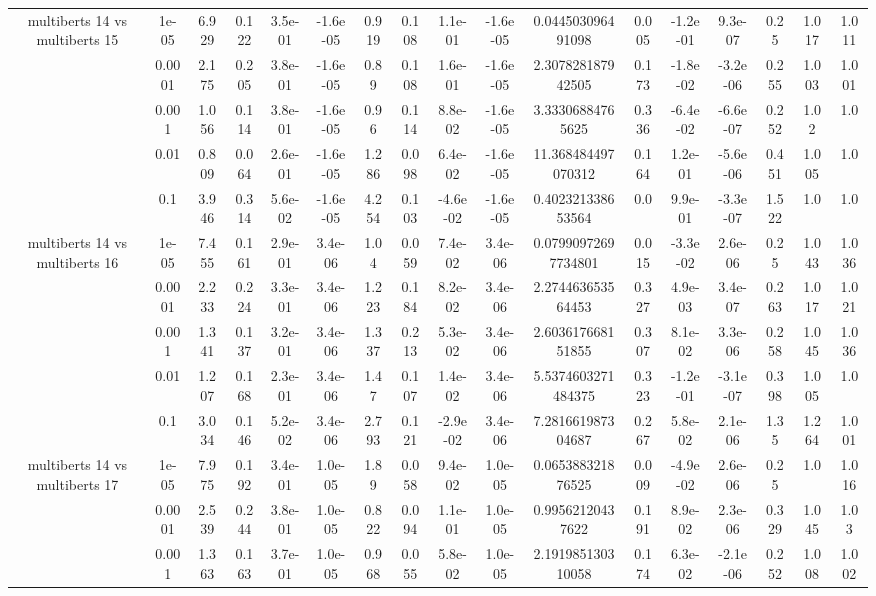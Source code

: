 \begin{tabular}{|c|c|c|c|c|c|c|c|c|c|c|c|c|c|c|c|c|}
\hline
\multirow{5}{*}{multiberts 14 vs multiberts 15} & 1e-05 & 6.929 & 0.122 & 3.5e-01 & -1.6e-05 & 0.919 & 0.108 & 1.1e-01 & -1.6e-05 & 0.044503096491098 & 0.005 & -1.2e-01 & 9.3e-07 & 0.25 & 1.017 & 1.011 \\
 & 0.0001 & 2.175 & 0.205 & 3.8e-01 & -1.6e-05 & 0.89 & 0.108 & 1.6e-01 & -1.6e-05 & 2.307828187942505 & 0.173 & -1.8e-02 & -3.2e-06 & 0.255 & 1.003 & 1.001 \\
 & 0.001 & 1.056 & 0.114 & 3.8e-01 & -1.6e-05 & 0.96 & 0.114 & 8.8e-02 & -1.6e-05 & 3.33306884765625 & 0.336 & -6.4e-02 & -6.6e-07 & 0.252 & 1.02 & 1.0 \\
 & 0.01 & 0.809 & 0.064 & 2.6e-01 & -1.6e-05 & 1.286 & 0.098 & 6.4e-02 & -1.6e-05 & 11.368484497070312 & 0.164 & 1.2e-01 & -5.6e-06 & 0.451 & 1.005 & 1.0 \\
 & 0.1 & 3.946 & 0.314 & 5.6e-02 & -1.6e-05 & 4.254 & 0.103 & -4.6e-02 & -1.6e-05 & 0.402321338653564 & 0.0 & 9.9e-01 & -3.3e-07 & 1.522 & 1.0 & 1.0 \\
\hline
\multirow{5}{*}{multiberts 14 vs multiberts 16} & 1e-05 & 7.455 & 0.161 & 2.9e-01 & 3.4e-06 & 1.04 & 0.059 & 7.4e-02 & 3.4e-06 & 0.07990972697734801 & 0.015 & -3.3e-02 & 2.6e-06 & 0.25 & 1.043 & 1.036 \\
 & 0.0001 & 2.233 & 0.224 & 3.3e-01 & 3.4e-06 & 1.223 & 0.184 & 8.2e-02 & 3.4e-06 & 2.274463653564453 & 0.327 & 4.9e-03 & 3.4e-07 & 0.263 & 1.017 & 1.021 \\
 & 0.001 & 1.341 & 0.137 & 3.2e-01 & 3.4e-06 & 1.337 & 0.213 & 5.3e-02 & 3.4e-06 & 2.603617668151855 & 0.307 & 8.1e-02 & 3.3e-06 & 0.258 & 1.045 & 1.036 \\
 & 0.01 & 1.207 & 0.168 & 2.3e-01 & 3.4e-06 & 1.47 & 0.107 & 1.4e-02 & 3.4e-06 & 5.5374603271484375 & 0.323 & -1.2e-01 & -3.1e-07 & 0.398 & 1.005 & 1.0 \\
 & 0.1 & 3.034 & 0.146 & 5.2e-02 & 3.4e-06 & 2.793 & 0.121 & -2.9e-02 & 3.4e-06 & 7.281661987304687 & 0.267 & 5.8e-02 & 2.1e-06 & 1.35 & 1.264 & 1.001 \\
\hline
\multirow{5}{*}{multiberts 14 vs multiberts 17} & 1e-05 & 7.975 & 0.192 & 3.4e-01 & 1.0e-05 & 1.89 & 0.058 & 9.4e-02 & 1.0e-05 & 0.065388321876525 & 0.009 & -4.9e-02 & 2.6e-06 & 0.25 & 1.0 & 1.016 \\
 & 0.0001 & 2.539 & 0.244 & 3.8e-01 & 1.0e-05 & 0.822 & 0.094 & 1.1e-01 & 1.0e-05 & 0.99562120437622 & 0.191 & 8.9e-02 & 2.3e-06 & 0.329 & 1.045 & 1.03 \\
 & 0.001 & 1.363 & 0.163 & 3.7e-01 & 1.0e-05 & 0.968 & 0.055 & 5.8e-02 & 1.0e-05 & 2.191985130310058 & 0.174 & 6.3e-02 & -2.1e-06 & 0.252 & 1.008 & 1.002 \\

\end{tabular}
